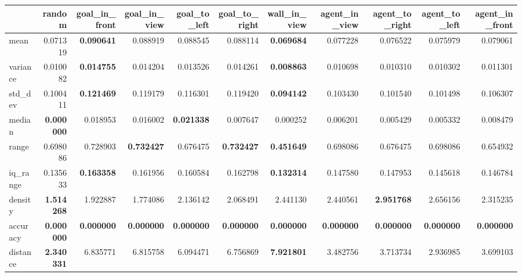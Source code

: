 \begin{tabular}{lrrrrrrrrrr}
\toprule
 & random & goal\_in\_front & goal\_in\_view & goal\_to\_left & goal\_to\_right & wall\_in\_view & agent\_in\_view & agent\_to\_right & agent\_to\_left & agent\_in\_front \\
\midrule
mean & 0.071319 & \color{f_darkred} \bfseries 0.090641 & 0.088919 & 0.088545 & 0.088114 & \color{f_green} \bfseries 0.069684 & 0.077228 & 0.076522 & 0.075979 & 0.079061 \\
variance & 0.010082 & \color{f_darkred} \bfseries 0.014755 & 0.014204 & 0.013526 & 0.014261 & \color{f_green} \bfseries 0.008863 & 0.010698 & 0.010310 & 0.010302 & 0.011301 \\
std\_dev & 0.100411 & \color{f_darkred} \bfseries 0.121469 & 0.119179 & 0.116301 & 0.119420 & \color{f_green} \bfseries 0.094142 & 0.103430 & 0.101540 & 0.101498 & 0.106307 \\
median & \color{f_green} \bfseries 0.000000 & 0.018953 & 0.016002 & \color{f_darkred} \bfseries 0.021338 & 0.007647 & 0.000252 & 0.006201 & 0.005429 & 0.005332 & 0.008479 \\
range & 0.698086 & 0.728903 & \color{f_darkred} \bfseries 0.732427 & 0.676475 & \color{f_darkred} \bfseries 0.732427 & \color{f_green} \bfseries 0.451649 & 0.698086 & 0.676475 & 0.698086 & 0.654932 \\
iq\_range & 0.135633 & \color{f_darkred} \bfseries 0.163358 & 0.161956 & 0.160584 & 0.162798 & \color{f_green} \bfseries 0.132314 & 0.147580 & 0.147953 & 0.145618 & 0.146784 \\
density & \color{f_green} \bfseries 1.514268 & 1.922887 & 1.774086 & 2.136142 & 2.068491 & 2.441130 & 2.440561 & \color{f_darkred} \bfseries 2.951768 & 2.656156 & 2.315235 \\
accuracy & \color{f_darkred} \bfseries \color{f_green} \bfseries 0.000000 & \color{f_darkred} \bfseries \color{f_green} \bfseries 0.000000 & \color{f_darkred} \bfseries \color{f_green} \bfseries 0.000000 & \color{f_darkred} \bfseries \color{f_green} \bfseries 0.000000 & \color{f_darkred} \bfseries \color{f_green} \bfseries 0.000000 & \color{f_darkred} \bfseries \color{f_green} \bfseries 0.000000 & \color{f_darkred} \bfseries \color{f_green} \bfseries 0.000000 & \color{f_darkred} \bfseries \color{f_green} \bfseries 0.000000 & \color{f_darkred} \bfseries \color{f_green} \bfseries 0.000000 & \color{f_darkred} \bfseries \color{f_green} \bfseries 0.000000 \\
distance & \color{f_green} \bfseries 2.340331 & 6.835771 & 6.815758 & 6.094471 & 6.756869 & \color{f_darkred} \bfseries 7.921801 & 3.482756 & 3.713734 & 2.936985 & 3.699103 \\
\bottomrule
\end{tabular}